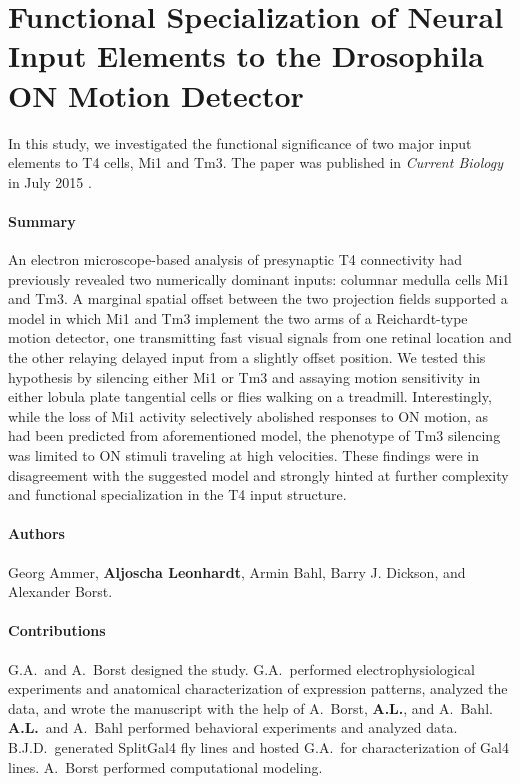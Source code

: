 \section{Functional Specialization of Neural Input Elements to the Drosophila ON Motion Detector}
\label{sct:manuscript_ammer}

In this study, we investigated the functional significance of two major input elements to T4 cells, Mi1 and Tm3. The paper was published in \textit{Current Biology} in July 2015 \citep{Ammer:2015jo}.

\paragraph{Summary}
An electron microscope-based analysis of presynaptic T4 connectivity had previously revealed two numerically dominant inputs: columnar medulla cells Mi1 and Tm3. A marginal spatial offset between the two projection fields supported a model in which Mi1 and Tm3 implement the two arms of a Reichardt-type motion detector, one transmitting fast visual signals from one retinal location and the other relaying delayed input from a slightly offset position. We tested this hypothesis by silencing either Mi1 or Tm3 and assaying motion sensitivity in either lobula plate tangential cells or flies walking on a treadmill. Interestingly, while the loss of Mi1 activity selectively abolished responses to ON motion, as had been predicted from aforementioned model, the phenotype of Tm3 silencing was limited to ON stimuli traveling at high velocities. These findings were in disagreement with the suggested model and strongly hinted at further complexity and functional specialization in the T4 input structure.

\paragraph{Authors} Georg Ammer, \textbf{Aljoscha Leonhardt}, Armin Bahl, Barry J. Dickson, and Alexander Borst.

\paragraph{Contributions}
G.A.\ and A.\ Borst designed the study. G.A.\ performed electrophysiological experiments and anatomical characterization of expression patterns, analyzed the data, and wrote the manuscript with the help of A.\ Borst, \textbf{A.L.}, and A.\ Bahl. \textbf{A.L.}\ and A.\ Bahl performed behavioral experiments and analyzed data. B.J.D.\ generated SplitGal4 fly lines and hosted G.A.\ for characterization of Gal4 lines. A.\ Borst performed computational modeling.

\cleardoublepage

